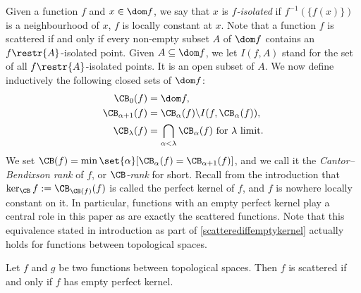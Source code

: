 Given a function $f$ and $x\in\dom f$, we say that $x$ is \textit{$f$-isolated} if $f^{-1}(\{f(x)\})$ is a neighbourhood of $x$, \ie $f$ is locally constant at $x$.
Note that a function $f$ is scattered if and only if every non-empty subset $A$ of $\dom f$ contains an $f\restr{A}$-isolated point.
Given $A\subseteq\dom f$, we let $I(f,A)$ stand for the set of all $f\restr{A}$-isolated points. It is an open subset of $A$.
We now define inductively the following closed sets of $\dom f$:
\begin{align*}
\CB_0(f)&=\dom f,\\
\CB_{\alpha+1}(f)&=\CB_\alpha(f)\backslash I(f,\CB_\alpha(f)),\\ 
\CB_\lambda(f)&=\bigcap_{\alpha<\lambda}\CB_\alpha(f)\mbox{ for }\lambda\mbox{ limit.}
\end{align*}
We set $\CB(f)=\min\set{\alpha}[\CB_\alpha(f)=\CB_{\alpha+1}(f)]$, and
we call it the \textit{Cantor--Bendixson rank} of $f$, or \emph{$\CB$-rank} for short.
Recall from the introduction that $\ker_{\CB}{f}:=\CB_{\CB(f)}(f)$ is called the perfect kernel of $f$, and $f$ is nowhere locally constant on it.
In particular, functions with an empty perfect kernel play a central role in this paper as are exactly the scattered functions. 
Note that this equivalence stated in introduction as part of \cref{scatterediffemptykernel} actually holds for functions between topological spaces. 

\begin{proposition}\label{scatterediffemptykernel_general}
Let $f$ and $g$ be two functions between topological spaces. Then $f$ is scattered if and only if $f$ has empty perfect kernel. 
\end{proposition}

